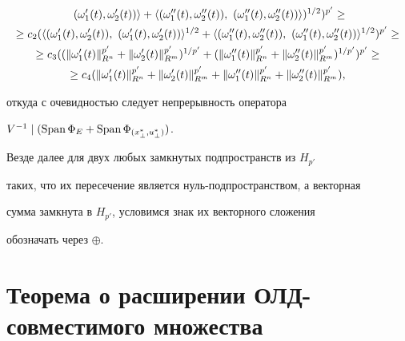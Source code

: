 \begin{pf}
\begin{gather*}
\ (\omega'_1(t),\omega'_2(t))\ra+ 


\la(\omega''_1(t),\omega''_2(t)), 


\ (\omega''_1(t),\omega''_2(t))\ra)^{1/2})^{p'}\ge\\


%


\ge c_2(\la(\omega'_1(t),\omega'_2(t)), 


\ (\omega'_1(t),\omega'_2(t))\ra^{1/2}+ 


\la(\omega''_1(t),\omega''_2(t)), 


\ (\omega''_1(t),\omega''_2(t))\ra^{1/2})^{p'}\ge \\


% 


\ge c_3((\|\omega'_1(t)\|^{p'}_{R^n}+ 


\|\omega'_2(t)\|^{p'}_{R^m})^{1/p'}+ 


(\|\omega''_1(t)\|^{p'}_{R^n}+ 


\|\omega''_2(t)\|^{p'}_{R^m})^{1/p'})^{p'}\ge \\ 


% 


\ge c_4(\|\omega'_1(t)\|^{p'}_{R^n}+ 


\|\omega'_2(t)\|^{p'}_{R^m}+ 


\|\omega''_1(t)\|^{p'}_{R^n}+ 


\|\omega''_2(t)\|^{p'}_{R^m}), 


\end{gather*} 


откуда с очевидностью следует непрерывность оператора 


$V^{-1}\mid(\operatorname{Span}\Phi_E+\operatorname{Span}\Phi_{{(x^*_{\bot},u^*_{\bot})}})$. 


\end{pf} 


 


Везде далее для двух любых замкнутых подпространств из $H_{p'}$ 


таких, что их пересечение является нуль-подпространством, а векторная 


сумма замкнута в $H_{p'}$, условимся знак их векторного сложения 


обозначать через $\oplus$. 


 


\section{Теорема о расширении ОЛД-совместимого множества} 


